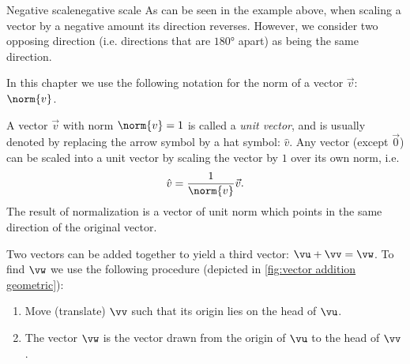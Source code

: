 \begin{note}{Negative scale}{negative scale}
	As can be seen in the example above, when scaling a vector by a negative amount its direction reverses. However, we consider two opposing direction (i.e. directions that are $\ang{180}$ apart) as being the same direction.
\end{note}

In this chapter we use the following notation for the norm of a vector $\vec{v}$: $\norm{v}$.

A vector $\vec{v}$ with norm $\norm{v}=1$ is called a \emph{unit vector}, and is usually denoted by replacing the arrow symbol by a hat symbol: $\hat{v}$. Any vector (except $\vec{0}$) can be scaled into a unit vector by scaling  the vector by $1$ over its own norm, i.e.
\begin{equation}
	\hat{v} = \frac{1}{\norm{v}}\vec{v}.
	\label{eq:normalized vector}
\end{equation}
The result of normalization is a vector of unit norm which points in the same direction of the original vector.

Two vectors can be added together to yield a third vector: $\vu+\vv=\vw$. To find $\vw$ we use the following procedure (depicted in \autoref{fig:vector addition geometric}):
\begin{enumerate}
	\item Move (translate) $\vv$ such that its origin lies on the head of $\vu$.
	\item The vector $\vw$ is the vector drawn from the origin of $\vu$ to the head of $\vv$.
\end{enumerate}

